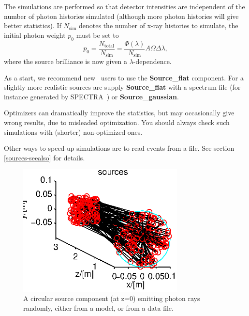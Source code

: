 The simulations are performed so that detector intensities
are independent of the number of photon histories simulated
(although more photon histories will give better statistics).
If $N_\mathrm{sim}$ denotes the number of
x-ray histories to simulate, the initial photon weight $p_0$ must be set to
\begin{equation}
\label{proprule}
p_0 = \frac{N_\mathrm{total}}{N_\mathrm{sim}} =
    \frac{\Phi(\lambda)}{N_\mathrm{sim}} A \Omega \Delta\lambda ,
\end{equation}
where the source brilliance is now given a $\lambda$-dependence.

As a start, we recommend new \MCX\ users to use the
\textbf{Source\_flat} component.
For a slightly more realistic sources are supply \textbf{Source\_flat} with a spectrum file (for instance
generated by SPECTRA~\cite{spectra}) or \textbf{Source\_gaussian}.

Optimizers can dramatically improve the statistics, but may occasionally
give wrong results, due to misleaded optimization.
You should always check such simulations with (shorter) non-optimized ones.

Other ways to speed-up simulations are to read events from a file.
See section \ref{sources-seealso} for details.

\begin{figure}
  \begin{center}
    \includegraphics[width=0.75\textwidth]{figures/sources.eps}
  \end{center}
\caption{A circular source component (at z=0) emitting photon rays randomly, either from a model, or from a data file.}
\label{f:source}
\end{figure}

\newpage



